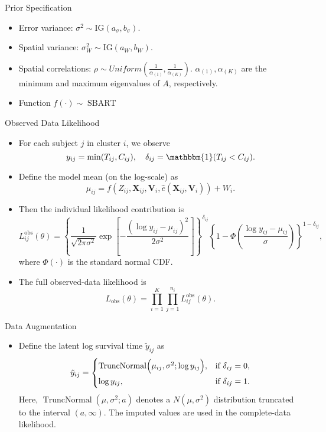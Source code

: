 \documentclass{beamer}
\begin{document}
\begin{frame}{Prior Specification}
  \begin{itemize}
    \item Error variance: \( \sigma^2 \sim \mathrm{IG}(a_\sigma,b_\sigma) \).
    \item Spatial variance: \( \sigma_W^2 \sim \mathrm{IG}(a_W,b_W) \).
    \item Spatial correlations: \(\rho \sim Uniform(\frac{1}{\alpha_{(1)}},\frac{1}{\alpha_{(K)}})\). \(\alpha_{(1)},\alpha_{(K)}\) are the minimum and maximum eigenvalues of \(A\), respectively.
    \item Function \( f(\cdot) \sim \operatorname{SBART}\)
  \end{itemize}
\end{frame}

\begin{frame}{Observed Data Likelihood}
  \begin{itemize}
    \item For each subject \(j\) in cluster \(i\), we observe
      \[
      y_{ij} = \min(T_{ij}, C_{ij}), \quad \delta_{ij} = \mathbbm{1}(T_{ij} < C_{ij}).
      \]
    \item Define the model mean (on the log-scale) as
      \[
      \mu_{ij} = f(Z_{ij}, \mathbf{X}_{ij}, \mathbf{V}_i, \hat{e}(\mathbf{X}_{ij},\mathbf{V}_i)) + W_i.
      \]
    \item Then the individual likelihood contribution is
      \[
      L_{ij}^{\text{obs}}(\theta) = \left\{ \frac{1}{\sqrt{2\pi\sigma^2}}
      \exp\!\left[-\frac{(\log y_{ij} - \mu_{ij})^2}{2\sigma^2}\right] \right\}^{\delta_{ij}}
      \left\{ 1 - \Phi\!\left(\frac{\log y_{ij} - \mu_{ij}}{\sigma}\right) \right\}^{1-\delta_{ij}},
      \]
      where \(\Phi(\cdot)\) is the standard normal CDF.
    \item The full observed-data likelihood is
      \[
      L_{\text{obs}}(\theta) = \prod_{i=1}^K \prod_{j=1}^{n_i} L_{ij}^{\text{obs}}(\theta).
      \]
  \end{itemize}
\end{frame}

\begin{frame}{ Data Augmentation}
  \begin{itemize}
    \item  Define the latent log survival time \( \tilde{y}_{ij}\) as
      \[
      \tilde{y}_{ij} =
      \begin{cases}
        \operatorname{TruncNormal}\Bigl(\mu_{ij},\sigma^2;\log y_{ij}\Bigr), & \text{if } \delta_{ij}=0, \\[1ex]
        \log y_{ij}, & \text{if } \delta_{ij}=1.
      \end{cases}
      \]
      Here, \(\operatorname{TruncNormal}(\mu,\sigma^2;a)\) denotes a \(N(\mu,\sigma^2)\) distribution truncated to the interval \((a,\infty)\). The imputed values are used in the complete-data likelihood.
  \end{itemize}
\end{frame}
\end{document}
